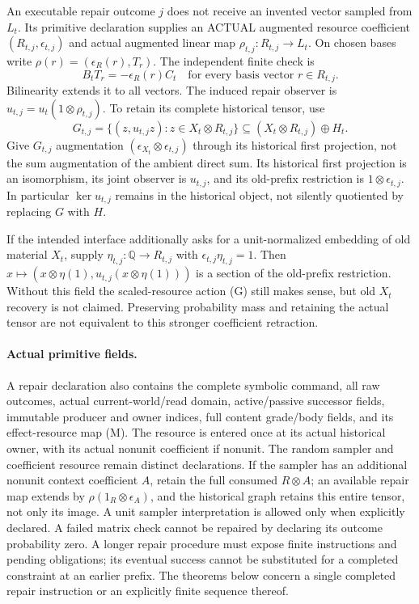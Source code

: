 \documentclass[11pt]{article}
\begin{document}
An executable repair outcome $j$ does not receive an invented vector sampled from $L_t$. Its primitive declaration supplies an ACTUAL augmented resource coefficient $(R_{t,j},\epsilon_{t,j})$ and actual augmented linear map
$\rho_{t,j}:R_{t,j}\to L_t$. On chosen bases write
$\rho(r)=(\epsilon_R(r),T_r)$. The independent finite check is
\[
 B_tT_r=-\epsilon_R(r)C_t\quad\text{for every basis vector }r\in R_{t,j}.
\tag{M}
\]
Bilinearity extends it to all vectors. The induced repair observer is
$u_{t,j}=u_t(1\otimes\rho_{t,j})$. To retain its complete historical tensor, use
\[
 G_{t,j}=\{(z,u_{t,j}z):z\in X_t\otimes R_{t,j}\}
   \subseteq(X_t\otimes R_{t,j})\oplus H_t.
\tag{G}
\]
Give $G_{t,j}$ augmentation $(\epsilon_{X_t}\otimes\epsilon_{t,j})$ through its historical first projection, not the sum augmentation of the ambient direct sum. Its historical first projection is an isomorphism, its joint observer is $u_{t,j}$, and its old-prefix restriction is $1\otimes\epsilon_{t,j}$. In particular $\ker u_{t,j}$ remains in the historical object, not silently quotiented by replacing $G$ with $H$.

If the intended interface additionally asks for a unit-normalized embedding of old material $X_t$, supply $\eta_{t,j}:\mathbb Q\to R_{t,j}$ with $\epsilon_{t,j}\eta_{t,j}=1$. Then $x\mapsto(x\otimes\eta(1),u_{t,j}(x\otimes\eta(1)))$ is a section of the old-prefix restriction. Without this field the scaled-resource action (G) still makes sense, but old $X_t$ recovery is not claimed. Preserving probability mass and retaining the actual tensor are not equivalent to this stronger coefficient retraction.

\paragraph{Actual primitive fields.}
A repair declaration also contains the complete symbolic command, all raw outcomes, actual current-world/read domain, active/passive successor fields, immutable producer and owner indices, full content grade/body fields, and its effect-resource map (M). The resource is entered once at its actual historical owner, with its actual nonunit coefficient if nonunit. The random sampler and coefficient resource remain distinct declarations. If the sampler has an additional nonunit context coefficient $A$, retain the full consumed $R\otimes A$; an available repair map extends by $\rho(1_R\otimes\epsilon_A)$, and the historical graph retains this entire tensor, not only its image. A unit sampler interpretation is allowed only when explicitly declared. A failed matrix check cannot be repaired by declaring its outcome probability zero. A longer repair procedure must expose finite instructions and pending obligations; its eventual success cannot be substituted for a completed constraint at an earlier prefix. The theorems below concern a single completed repair instruction or an explicitly finite sequence thereof.
\end{document}
